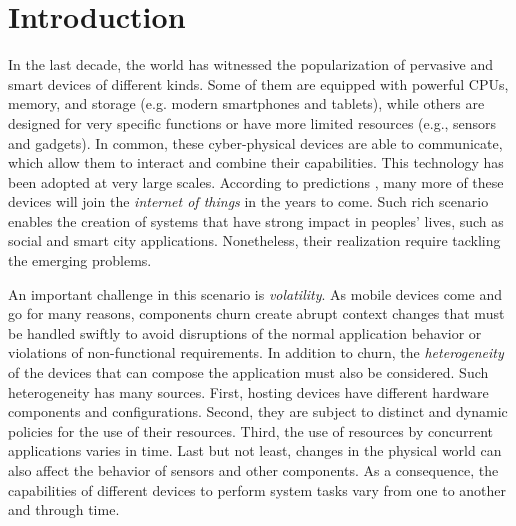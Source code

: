 \section{Introduction}
\label{sec:intro}


In the last decade, the world has witnessed the popularization of pervasive and smart devices of different kinds. Some of them are equipped with powerful CPUs, memory, and storage (e.g. modern smartphones and tablets), while others are designed for very specific functions or have more limited resources (e.g., sensors and gadgets). In common, these cyber-physical devices are able to communicate, which allow them to interact and combine their capabilities. This technology has been %
adopted at very large scales. According to predictions \cite{IHS:2016}, many more of these devices will join the \textit{internet of things} in the years to come. Such rich scenario enables the creation of systems that have strong impact in peoples' lives, such as social and smart city applications. Nonetheless, their realization require tackling the emerging problems.

An important challenge in this scenario is \textit{volatility}. As mobile devices come and go for many reasons, components churn create abrupt context changes that must be handled swiftly to avoid disruptions of the normal application behavior or violations of non-functional requirements. 
In addition to churn, the \textit{heterogeneity} of the devices that can compose the application must also be considered. Such heterogeneity has many sources. First, hosting devices have different hardware components and configurations. Second, they are subject to distinct and dynamic policies for the use of their resources. Third, the use of resources by concurrent applications varies in time. Last but not least, changes in the physical world %
can also affect the behavior of sensors and other components. As a consequence, the capabilities of different devices to perform system tasks vary from one to another and through time.



